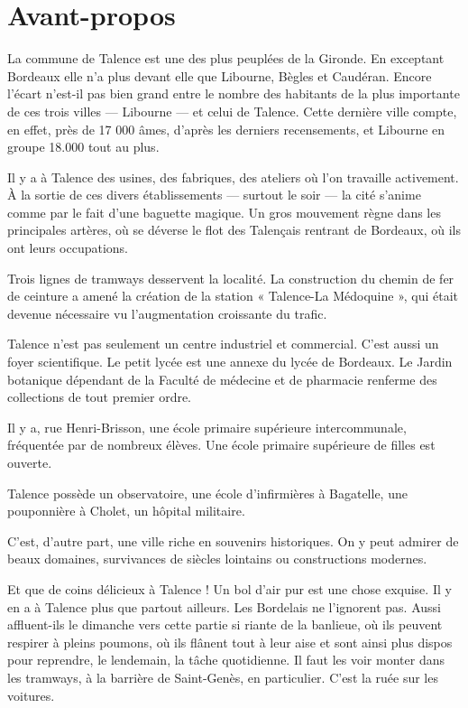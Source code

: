 \section{Avant-propos}

La commune de Talence est une des plus peuplées de la Gironde. En exceptant Bordeaux elle n'a plus devant elle que Libourne, Bègles et Caudéran. Encore l'écart n'est-il pas bien grand entre le nombre des habitants de la plus importante de ces trois villes — Libourne — et celui de Talence. Cette dernière ville compte, en effet, près de 17 000 âmes, d'après les derniers recensements, et Libourne en groupe 18.000 tout au plus.

Il y a à Talence des usines, des fabriques, des ateliers où l'on travaille activement. À la sortie de ces divers établissements — surtout le soir — la cité s'anime comme par le fait d'une baguette magique. Un gros mouvement règne dans les principales artères, où se déverse le flot des Talençais rentrant de Bordeaux, où ils ont leurs occupations.

Trois lignes de tramways desservent la localité. La construction du chemin de fer de ceinture a amené la création de la station « Talence-La Médoquine », qui était devenue nécessaire vu l'augmentation croissante du trafic.

Talence n'est pas seulement un centre industriel et commercial. C'est aussi un foyer scientifique. Le petit lycée est une annexe du lycée de Bordeaux. Le Jardin botanique dépendant de la Faculté de médecine et de pharmacie renferme des collections de tout premier ordre.

Il y a, rue Henri-Brisson, une école primaire supérieure intercommunale, fréquentée par de nombreux élèves. Une école primaire supérieure de filles est ouverte.

Talence possède un observatoire, une école d'infirmières à Bagatelle, une pouponnière à Cholet, un hôpital militaire.

C'est, d'autre part, une ville riche en souvenirs historiques. On y peut admirer de beaux domaines, survivances de siècles lointains ou constructions modernes.

Et que de coins délicieux à Talence ! Un bol d'air pur est une chose exquise. Il y en a à Talence plus que partout ailleurs. Les Bordelais ne l'ignorent pas. Aussi affluent-ils le dimanche vers cette partie si riante de la banlieue, où ils peuvent respirer à pleins poumons, où ils flânent tout à leur aise et sont ainsi plus dispos pour reprendre, le lendemain, la tâche quotidienne. Il faut les voir monter dans les tramways, à la barrière de Saint-Genès, en particulier. C'est la ruée sur les voitures.

